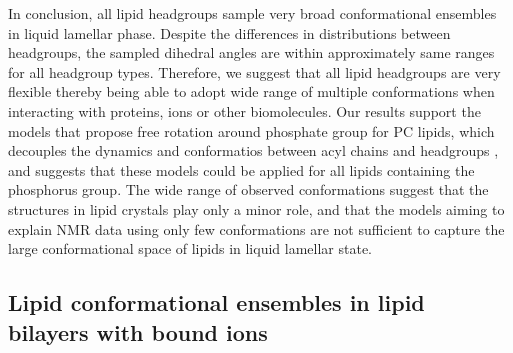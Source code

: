 \documentclass[aps,prl,superscriptaddress,twocolumn]{revtex4}
\begin{document}
In conclusion, all lipid headgroups sample very broad conformational ensembles in liquid lamellar phase.
Despite the differences in distributions
between headgroups, the sampled dihedral angles are within approximately same ranges for all headgroup types.
Therefore, we suggest that all lipid headgroups are very flexible thereby being
able to adopt wide range of multiple conformations when interacting with proteins, ions or other biomolecules.
Our results support the models that propose free rotation around phosphate group for PC lipids,
which decouples the dynamics and conformatios between acyl chains and headgroups \cite{klauda08c,antila21b},
and suggests that these models could be applied for all lipids containing the phosphorus group.
The wide range of observed conformations suggest that the structures in lipid crystals \cite{buldt81,pascher92}
play only a minor role, and that the models aiming to explain NMR data using only few conformations \cite{seelig77c,davis83,Semchyschyn04,akutsu20}
are not sufficient to capture the large conformational space of lipids in liquid lamellar state.


\subsection{Lipid conformational ensembles in lipid bilayers with bound ions}
\end{document}
